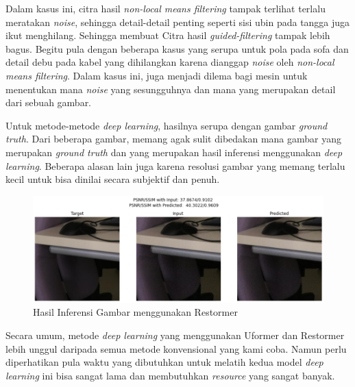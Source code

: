 \documentclass[11pt, a4paper, final]{report}
\begin{document}
Dalam kasus ini, citra hasil \textit{non-local means filtering} tampak terlihat terlalu meratakan \textit{noise}, sehingga detail-detail penting seperti sisi ubin pada tangga juga ikut menghilang. Sehingga membuat Citra hasil \textit{guided-filtering} tampak lebih bagus. Begitu pula dengan beberapa kasus yang serupa untuk pola pada sofa dan detail debu pada kabel yang dihilangkan karena dianggap \textit{noise} oleh \textit{non-local means filtering}. Dalam kasus ini, juga menjadi dilema bagi mesin untuk menentukan mana \textit{noise} yang sesungguhnya dan mana yang merupakan detail dari sebuah gambar.

Untuk metode-metode \textit{deep learning}, hasilnya serupa dengan gambar \textit{ground truth}. Dari beberapa gambar, memang agak sulit dibedakan mana gambar yang merupakan \textit{ground truth} dan yang merupakan hasil inferensi menggunakan \textit{deep learning}. Beberapa alasan lain juga karena resolusi gambar yang memang terlalu kecil untuk bisa dinilai secara subjektif dan penuh.

\begin{figure}[H]
\centering
\includegraphics[scale=0.5]{assets/RestormerImage.png}
\caption{Hasil Inferensi Gambar menggunakan Restormer}
\end{figure}

Secara umum, metode \textit{deep learning} yang menggunakan Uformer dan Restormer lebih unggul daripada semua metode konvensional yang kami coba. Namun perlu diperhatikan pula waktu yang dibutuhkan untuk melatih kedua model \textit{deep learning} ini bisa sangat lama dan membutuhkan \textit{resource} yang sangat banyak.
\end{document}
